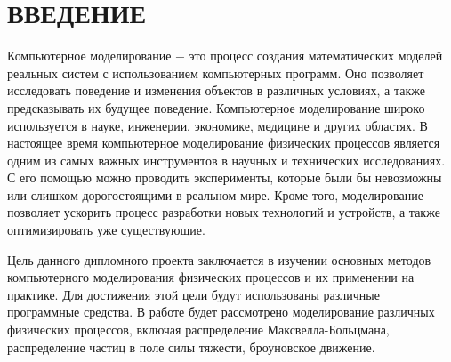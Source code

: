 \chapter*{ВВЕДЕНИЕ}
\label{ch:intro}
Компьютерное моделирование $-$ это процесс создания математических моделей реальных систем с использованием компьютерных программ. Оно позволяет исследовать поведение и изменения объектов в различных условиях, а также предсказывать их будущее поведение. Компьютерное моделирование широко используется в науке, инженерии, экономике, медицине и других областях. В настоящее время компьютерное моделирование физических процессов является одним из самых важных инструментов в научных и технических исследованиях. С его помощью можно проводить эксперименты, которые были бы невозможны или слишком дорогостоящими в реальном мире. Кроме того, моделирование позволяет ускорить процесс разработки новых технологий и устройств, а также оптимизировать уже существующие.

Цель данного дипломного проекта заключается в изучении основных методов компьютерного моделирования физических процессов и их применении на практике. Для достижения этой цели будут использованы различные программные средства. В работе будет рассмотрено моделирование различных физических процессов, включая распределение Максвелла-Больцмана, распределение частиц в поле силы тяжести, броуновское движение.
